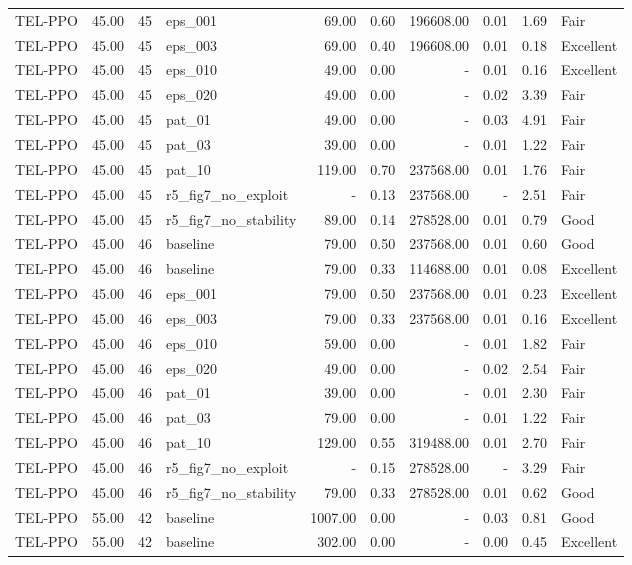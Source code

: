\begin{table}[htbp]
\begin{tabular}{lrrlrrrrrl}
TEL-PPO & 45.00 & 45 & eps_001 & 69.00 & 0.60 & 196608.00 & 0.01 & 1.69 & Fair \\
TEL-PPO & 45.00 & 45 & eps_003 & 69.00 & 0.40 & 196608.00 & 0.01 & 0.18 & Excellent \\
TEL-PPO & 45.00 & 45 & eps_010 & 49.00 & 0.00 & - & 0.01 & 0.16 & Excellent \\
TEL-PPO & 45.00 & 45 & eps_020 & 49.00 & 0.00 & - & 0.02 & 3.39 & Fair \\
TEL-PPO & 45.00 & 45 & pat_01 & 49.00 & 0.00 & - & 0.03 & 4.91 & Fair \\
TEL-PPO & 45.00 & 45 & pat_03 & 39.00 & 0.00 & - & 0.01 & 1.22 & Fair \\
TEL-PPO & 45.00 & 45 & pat_10 & 119.00 & 0.70 & 237568.00 & 0.01 & 1.76 & Fair \\
TEL-PPO & 45.00 & 45 & r5_fig7_no_exploit & - & 0.13 & 237568.00 & - & 2.51 & Fair \\
TEL-PPO & 45.00 & 45 & r5_fig7_no_stability & 89.00 & 0.14 & 278528.00 & 0.01 & 0.79 & Good \\
TEL-PPO & 45.00 & 46 & baseline & 79.00 & 0.50 & 237568.00 & 0.01 & 0.60 & Good \\
TEL-PPO & 45.00 & 46 & baseline & 79.00 & 0.33 & 114688.00 & 0.01 & 0.08 & Excellent \\
TEL-PPO & 45.00 & 46 & eps_001 & 79.00 & 0.50 & 237568.00 & 0.01 & 0.23 & Excellent \\
TEL-PPO & 45.00 & 46 & eps_003 & 79.00 & 0.33 & 237568.00 & 0.01 & 0.16 & Excellent \\
TEL-PPO & 45.00 & 46 & eps_010 & 59.00 & 0.00 & - & 0.01 & 1.82 & Fair \\
TEL-PPO & 45.00 & 46 & eps_020 & 49.00 & 0.00 & - & 0.02 & 2.54 & Fair \\
TEL-PPO & 45.00 & 46 & pat_01 & 39.00 & 0.00 & - & 0.01 & 2.30 & Fair \\
TEL-PPO & 45.00 & 46 & pat_03 & 79.00 & 0.00 & - & 0.01 & 1.22 & Fair \\
TEL-PPO & 45.00 & 46 & pat_10 & 129.00 & 0.55 & 319488.00 & 0.01 & 2.70 & Fair \\
TEL-PPO & 45.00 & 46 & r5_fig7_no_exploit & - & 0.15 & 278528.00 & - & 3.29 & Fair \\
TEL-PPO & 45.00 & 46 & r5_fig7_no_stability & 79.00 & 0.33 & 278528.00 & 0.01 & 0.62 & Good \\
TEL-PPO & 55.00 & 42 & baseline & 1007.00 & 0.00 & - & 0.03 & 0.81 & Good \\
TEL-PPO & 55.00 & 42 & baseline & 302.00 & 0.00 & - & 0.00 & 0.45 & Excellent \\

\end{tabular}
\end{table}
